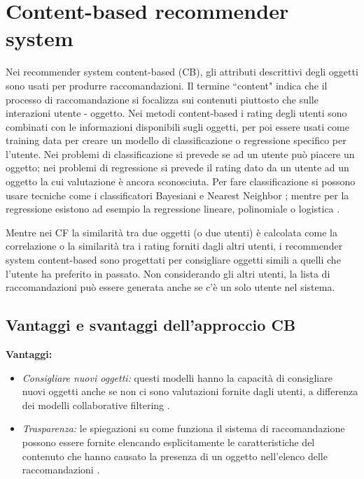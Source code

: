 \documentclass[12pt,italian]{report}
\begin{document}
\section{Content-based recommender system}
Nei recommender system content-based (CB), gli attributi descrittivi degli oggetti sono usati per produrre raccomandazioni. Il termine ``content" indica che il processo di raccomandazione si focalizza sui contenuti piuttosto che sulle interazioni utente - oggetto. Nei metodi content-based i rating degli utenti sono combinati con le informazioni disponibili sugli oggetti, per poi essere usati come training data per creare un modello di classificazione o regressione  specifico per l'utente. Nei problemi di classificazione si prevede se ad un utente può piacere un oggetto; nei problemi di regressione si prevede il rating dato da un utente ad un oggetto la cui valutazione è ancora sconosciuta. Per fare classificazione si possono usare tecniche come i classificatori Bayesiani \cite{recsys-book} e Nearest Neighbor \cite{nearest-neighbor}; mentre per la regressione esistono ad esempio la regressione lineare, polinomiale o logistica \cite{recsys-book}.

Mentre nei CF la similarità tra due oggetti (o due utenti) è calcolata come la correlazione o la similarità tra i rating forniti dagli altri utenti, i recommender system content-based sono progettati per consigliare oggetti simili a quelli che l'utente ha preferito in passato. Non considerando gli altri utenti, la lista di raccomandazioni può essere generata anche se c'è un solo utente nel sistema.

\subsection{Vantaggi e svantaggi dell'approccio CB}
\textbf{Vantaggi:}
\begin{itemize}
 \item \textit{Consigliare nuovi oggetti:} questi modelli hanno la capacità di consigliare nuovi oggetti anche se non ci sono valutazioni fornite dagli utenti, a differenza dei modelli collaborative filtering \cite{recsys-principle-methods-evaluation}.
 
 \item \textit{Trasparenza:} le spiegazioni su come funziona il sistema di raccomandazione possono essere fornite elencando esplicitamente le caratteristiche del contenuto che hanno causato la presenza di un oggetto nell'elenco delle raccomandazioni \cite{transparency}. 
\end{itemize}
\end{document}
